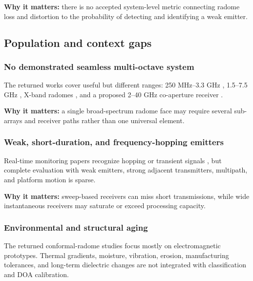 \documentclass[
  10pt,
]{article}
\begin{document}
\textbf{Why it matters:} there is no accepted system-level metric
connecting radome loss and distortion to the probability of detecting
and identifying a weak emitter.

\subsection{Population and context
gaps}\label{population-and-context-gaps}

\subsubsection{No demonstrated seamless multi-octave
system}\label{no-demonstrated-seamless-multi-octave-system}

The returned works cover useful but different ranges: 250 MHz--3.3 GHz
\citep{caratelli2011, liberal2011}, 1.5--7.5 GHz \citep{tianang2017},
X-band radomes \citep{sheng2024, tahseen2021}, and a proposed 2--40 GHz
co-aperture receiver \citep{pi2025}.

\textbf{Why it matters:} a single broad-spectrum radome face may require
several sub-arrays and receiver paths rather than one universal element.

\subsubsection{Weak, short-duration, and frequency-hopping
emitters}\label{weak-short-duration-and-frequency-hopping-emitters}

Real-time monitoring papers recognize hopping or transient signals
\citep{flak2022, sorecau2026}, but complete evaluation with weak
emitters, strong adjacent transmitters, multipath, and platform motion
is sparse.

\textbf{Why it matters:} sweep-based receivers can miss short
transmissions, while wide instantaneous receivers may saturate or exceed
processing capacity.

\subsubsection{Environmental and structural
aging}\label{environmental-and-structural-aging}

The returned conformal-radome studies focus mostly on electromagnetic
prototypes. Thermal gradients, moisture, vibration, erosion,
manufacturing tolerances, and long-term dielectric changes are not
integrated with classification and DOA calibration.
\end{document}

